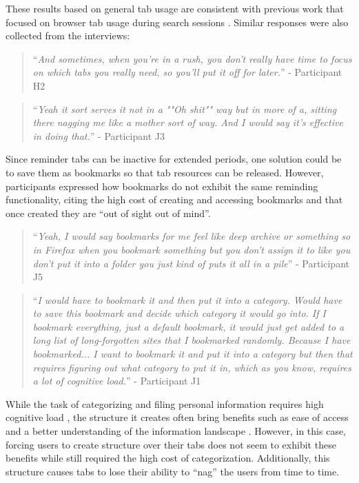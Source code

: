 These results based on general tab usage are consistent with previous work that focused on browser tab usage during search sessions \cite{huang2012no}.
Similar responses were also collected from the interviews:

\begin{quote}

``\emph{And sometimes, when you're in a rush, you don't really have time to focus on which tabs you really need, so you'll put it off for later.}'' - Participant H2
\end{quote}

\begin{quote}
``\emph{Yeah it sort serves it not in a ""Oh shit"" way but in more of a, sitting there nagging me like a mother sort of way. And I would say it's effective in doing that.}'' - Participant J3
\end{quote}

Since reminder tabs can be inactive for extended periods, one solution could be to save them as bookmarks so that tab resources can be released. However, participants expressed how bookmarks do not exhibit the same reminding functionality, citing the high cost of creating and accessing bookmarks and that once created they are ``out of sight out of mind''.

\begin{quote}
``\emph{Yeah, I would say bookmarks for me feel like deep archive or something so in Firefox when you bookmark something but you don't assign it to like you don't put it into a folder you just kind of puts it all in a pile}'' - Participant J5
\end{quote}

\begin{quote}
``\emph{I would have to bookmark it and then put it into a category. Would have to save this bookmark and decide which category it would go into. If I bookmark everything, just a default bookmark, it would just get added to a long list of long-forgotten sites that I bookmarked randomly. Because I have bookmarked... I want to bookmark it and put it into a category but then that requires figuring out what category to put it in, which as you know, requires a lot of cognitive load.}'' - Participant J1
\end{quote}

While the task of categorizing and filing personal information requires high cognitive load \cite{lansdale1988psychology},
the structure it creates often bring benefits such as ease of access and a better understanding of the information landscape \cite{strauss1998basics}. However, in this case, forcing users to create structure over their tabs does not seem to exhibit these benefits while still required the high cost of categorization. Additionally, this structure causes tabs to lose their ability to ``nag'' the users from time to time.

